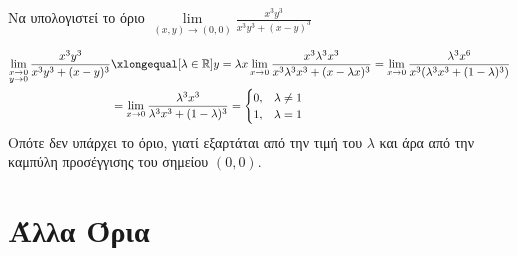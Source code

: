 \begin{example}
  Να υπολογιστεί το όριο 
  $ \lim\limits_{(x,y)\to (0, 0)} \frac{x^{3}y^{3}}{x^{3}y^{3}+ (x-y)^{3}} $ 
  \begin{solution}
  \item {}
    \begin{align*}
      \lim\limits_{\substack{x \to 0\\ y \to 0}} \frac{x^{3}y^{3}}{x^{3}y^{3} + 
      (x-y)^{3}} 
    &\xlongequal[\lambda \in \mathbb{R}]{y = \lambda x} \lim_{x \to 0} \frac{x^{3} 
    \lambda ^{3} x^{3}}{x^{3} \lambda ^{3} x^{3} + (x - \lambda x)^{3}} 
    = \lim_{x \to 0} \frac{\lambda ^{3}x^{6}}{x^{3} 
    (\lambda ^{3} x^{3} + (1- \lambda)^{3})} \\
    &= \lim_{x \to 0} \frac{\lambda ^{3} x^{3}}{\lambda ^{3}x^{3} + (1- \lambda)^{3}} 
    = 
    \begin{cases} 
      0, & \lambda \neq 1 \\ 
      1, & \lambda = 1 
    \end{cases} 
    \end{align*} 
    Οπότε δεν υπάρχει το όριο, γιατί εξαρτάται από την τιμή του 
    $ \lambda $ και άρα από την καμπύλη προσέγγισης του σημείου 
    $ (0,0) $.
  \end{solution}
\end{example}


\section{Άλλα Όρια}

